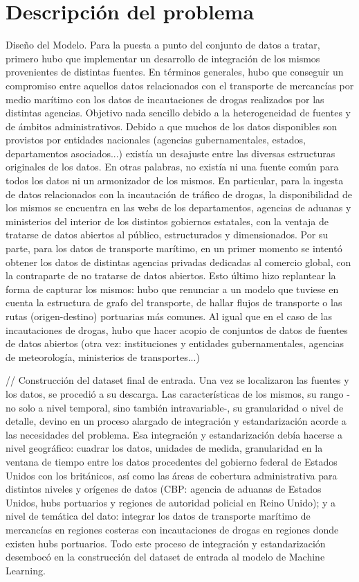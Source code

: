 \documentclass{article}
\begin{document}
\section{Descripción del problema}
Diseño del Modelo.
Para la puesta a punto del conjunto de datos a tratar, primero hubo que implementar un desarrollo de integración de los mismos provenientes de distintas fuentes.
En términos generales, hubo que conseguir un compromiso entre aquellos datos relacionados con el transporte de mercancías por medio marítimo con los datos de incautaciones de drogas realizados por las distintas agencias. Objetivo nada sencillo debido a la heterogeneidad de fuentes y de ámbitos administrativos. Debido a que muchos de los datos disponibles son provistos por entidades nacionales (agencias gubernamentales, estados, departamentos asociados...) existía un desajuste entre las diversas estructuras originales de los datos. En otras palabras, no existía ni una fuente común para todos los datos ni un armonizador de los mismos. En particular, para la ingesta de datos relacionados con la incautación de tráfico de drogas, la disponibilidad de los mismos se encuentra en las webs de los departamentos, agencias de aduanas y ministerios del interior de los distintos gobiernos estatales, con la ventaja de tratarse de datos abiertos al público, estructurados y dimensionados. Por su parte, para los datos de transporte marítimo, en un primer momento se intentó obtener los datos de distintas agencias privadas dedicadas al comercio global, con la contraparte de no tratarse de datos abiertos. Esto último hizo replantear la forma de capturar los mismos: hubo que renunciar a un modelo que tuviese en cuenta la estructura de grafo del transporte, de hallar flujos de transporte o las rutas (origen-destino) portuarias más comunes. Al igual que en el caso de las incautaciones de drogas, hubo que hacer acopio de conjuntos de datos de fuentes de datos abiertos (otra vez: instituciones y entidades gubernamentales, agencias de meteorología, ministerios de transportes...)

// Construcción del dataset final de entrada.
Una vez se localizaron las fuentes y los datos, se procedió a su descarga. Las características de los mismos, su rango -no solo a nivel temporal, sino también intravariable-, su granularidad o nivel de detalle, devino en un proceso alargado de integración y estandarización acorde a las necesidades del problema. Esa integración y estandarización debía hacerse a nivel geográfico: cuadrar los datos, unidades de medida, granularidad en la ventana de tiempo entre los datos procedentes del gobierno federal de Estados Unidos con los británicos, así como las áreas de cobertura administrativa para distintos niveles y orígenes de datos (CBP: agencia de aduanas de Estados Unidos, hubs portuarios y regiones de autoridad policial en Reino Unido); y a nivel de temática del dato: integrar los datos de transporte marítimo de mercancías en regiones costeras con incautaciones de drogas en regiones donde existen hubs portuarios. Todo este proceso de integración y estandarización desembocó en la construcción del dataset de entrada al modelo de Machine Learning.
\end{document}
